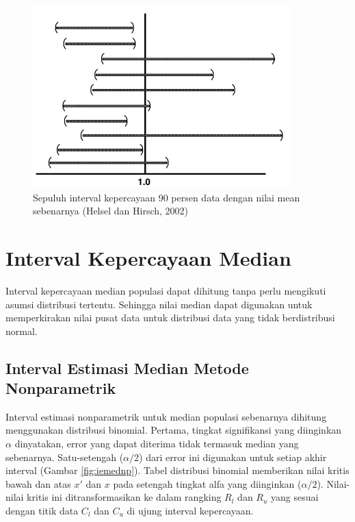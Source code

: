\documentclass[]{book}
\begin{document}
\begin{figure}

{\centering \includegraphics[width=0.65\linewidth]{iievis2} 

}

\caption{Sepuluh interval kepercayaan 90 persen data dengan nilai mean sebenarnya  (Helsel dan Hirsch, 2002)}\label{fig:iievis2}
\end{figure}

\section{Interval Kepercayaan Median}\label{interval-kepercayaan-median}

Interval kepercayaan median populasi dapat dihitung tanpa perlu
mengikuti asumsi distribusi tertentu. Sehingga nilai median dapat
digunakan untuk memperkirakan nilai pusat data untuk distribusi data
yang tidak berdistribusi normal.

\subsection{Interval Estimasi Median Metode
Nonparametrik}\label{interval-estimasi-median-metode-nonparametrik}

Interval estimasi nonparametrik untuk median populasi sebenarnya
dihitung menggunakan distribusi binomial. Pertama, tingkat signifikansi
yang diinginkan \(\alpha\) dinyatakan, error yang dapat diterima tidak
termasuk median yang sebenarnya. Satu-setengah (\(\alpha/2\)) dari error
ini digunakan untuk setiap akhir interval (Gambar \ref{fig:iemednp}).
Tabel distribusi binomial memberikan nilai kritis bawah dan atas \(x'\)
dan \(x\) pada setengah tingkat alfa yang diinginkan (\(\alpha/2\)).
Nilai-nilai kritis ini ditransformasikan ke dalam rangking \(R_l\) dan
\(R_u\) yang sesuai dengan titik data \(C_l\) dan \(C_u\) di ujung
interval kepercayaan.
\end{document}
